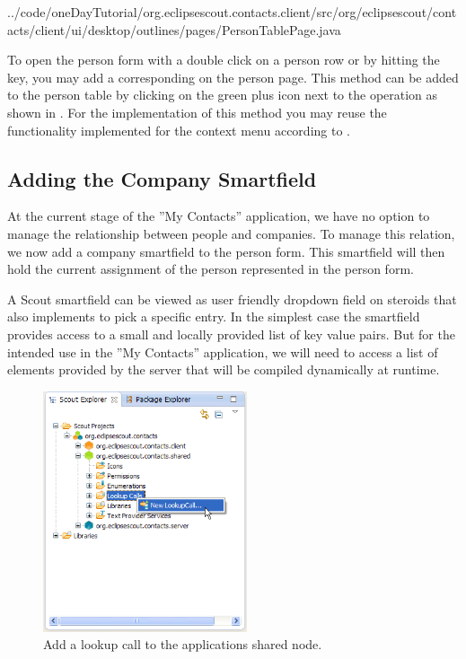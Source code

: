 \documentclass[a4paper,10pt,twoside]{book}
\begin{document}

{../code/oneDayTutorial/org.eclipsescout.contacts.client/src/org/eclipsescout/contacts/client/ui/desktop/outlines/pages/PersonTablePage.java}

To open the person form with a double click on a person row or by hitting the  key, you may add a corresponding  on the person page. 
This method can be added to the person table by clicking on the green plus icon next to the operation  as shown in . 
For the implementation of this method you may reuse the functionality implemented for the context menu according to . 

\subsection{Adding the Company Smartfield}

At the current stage of the ''My Contacts'' application, we have no option to manage the relationship between people and companies. 
To manage this relation, we now add a company smartfield to the person form. 
This smartfield will then hold the current assignment of the person represented in the person form. 

A Scout smartfield can be viewed as user friendly dropdown field on steroids that also implements  to pick a specific entry. 
In the simplest case the smartfield provides access to a small and locally provided list of key value pairs. 
But for the intended use in the ''My Contacts'' application, we will need to access a list of elements provided by the server that will be compiled dynamically at runtime. 

\begin{figure}
\includegraphics[width=6cm]{new_lookupcall_company_contextmenu.png} 
\caption{Add a lookup call to the applications shared node.}
\end{figure}
\end{document}
